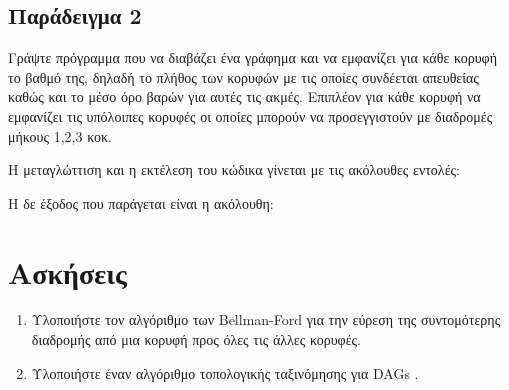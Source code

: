 \subsection{Παράδειγμα 2}
Γράψτε πρόγραμμα που να διαβάζει ένα γράφημα και να εμφανίζει για κάθε κορυφή το βαθμό της, δηλαδή το πλήθος των κορυφών με τις οποίες συνδέεται απευθείας καθώς και το μέσο όρο βαρών για αυτές τις ακμές. Επιπλέον για κάθε κορυφή να εμφανίζει τις υπόλοιπες κορυφές οι οποίες μπορούν να προσεγγιστούν με διαδρομές μήκους 1,2,3 κοκ.



Η μεταγλώττιση και η εκτέλεση του κώδικα γίνεται με τις ακόλουθες εντολές:



Η δε έξοδος που παράγεται είναι η ακόλουθη:



\section{Ασκήσεις}
\begin{enumerate}[nolistsep]
	\item Υλοποιήστε τον αλγόριθμο των Bellman-Ford \cite{brilliant_bellman_ford} για την εύρεση της συντομότερης διαδρομής από μια κορυφή προς όλες τις άλλες κορυφές.
	\item Υλοποιήστε έναν αλγόριθμο τοπολογικής ταξινόμησης για DAGs \cite{g4g_topological_sort}.
\end{enumerate}

